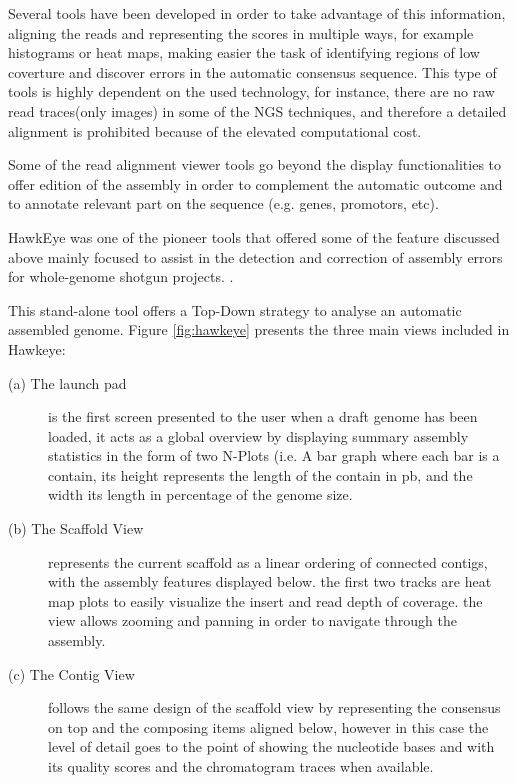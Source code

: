 Several tools have been developed in order to take advantage of this information, aligning the reads and representing the scores in multiple ways, for example histograms or heat maps, making easier the task of identifying regions of low coverture and discover errors in the automatic consensus sequence. This type of tools is highly dependent on the used technology, for instance, there are no raw read traces(only images) in some of the NGS techniques, and therefore a detailed alignment is prohibited because of the elevated computational cost.

Some of the read alignment viewer tools go beyond the display functionalities to offer edition of the assembly in order to complement the automatic outcome and to annotate relevant part on the sequence (e.g. genes, promotors, etc).

HawkEye was one of the pioneer tools that offered some of the feature discussed above mainly focused to assist in the detection and correction of assembly errors for whole-genome shotgun projects.  \cite{SCH2007}. 

This stand-alone tool offers a Top-Down strategy to analyse an automatic assembled genome. Figure \ref{fig:hawkeye} presents the three main views included in Hawkeye: 
\begin{description}
\item[(a) The launch pad] is the first screen presented to the user when a draft genome has been loaded, it acts as a global overview by displaying summary assembly statistics in the form of two N-Plots (i.e. A bar graph where each bar is a contain, its height represents the length of the contain in pb, and the width its length in percentage of the genome size.
\item[(b) The Scaffold View] represents the current scaffold as a linear ordering of connected contigs, with the assembly features displayed below. the first two tracks are heat map plots to easily visualize the insert and read depth of coverage. the view allows zooming and panning in order to navigate through the assembly.
\item[(c) The Contig View] follows the same design of the scaffold view by representing the consensus on top and the composing items aligned below, however in this case the level of detail goes to the point of showing the nucleotide bases and with its quality scores and the chromatogram traces when available.
\end{description}

